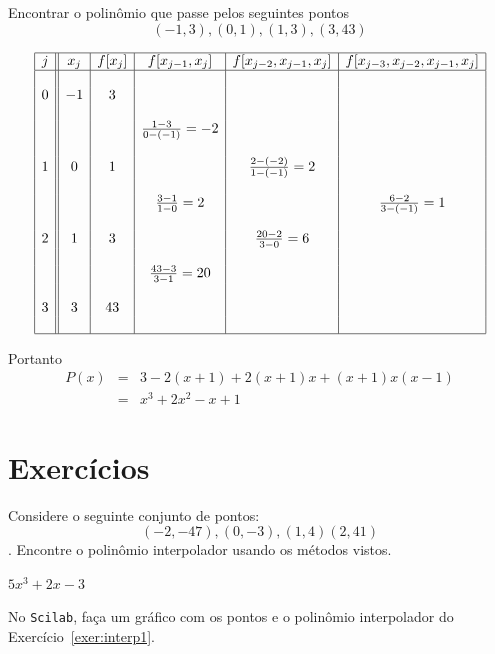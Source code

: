 \begin{ex}
Encontrar o polinômio que passe pelos seguintes pontos
$$(-1,3),(0,1),(1,3),(3,43)$$

\begin{equation*}
\begin{array}{|c||c|c|c|c|c|}\hline
 j&x_j&f[x_j]&f[x_{j-1},x_j]&f[x_{j-2},x_{j-1},x_j]&f[x_{j-3},x_{j-2},x_{j-1},x_j]\\\hline
&&&&&\\
0& -1 & 3&&&\\
&&&&&\\
&&&\frac{1-3}{0-(-1)}=-2&&\\
&&&&&\\
1&0&1&&\frac{2-(-2)}{1-(-1)}=2&\\
&&&&&\\
&&&\frac{3-1}{1-0}=2&&\frac{6-2}{3-(-1)}=1\\
&&&&&\\
2&1&3&&\frac{20-2}{3-0}=6&\\
&&&&&\\
&&&\frac{43-3}{3-1}=20&&\\
&&&&&\\
3&3&43&&&\\
&&&&&\\\hline
\end{array}  
\end{equation*}



Portanto
\begin{eqnarray*}
P(x)&=&3-2(x+1)+2(x+1)x+(x+1)x(x-1)\\
&=&x^3+2x^2-x+1
\end{eqnarray*}
\end{ex}

\section*{Exercícios}


\begin{Exercise}\label{exer:interp1}
Considere o seguinte conjunto de pontos: $$(-2,-47),(0,-3),(1,4)(2,41)$$. Encontre o polinômio interpolador usando os métodos vistos. 
\end{Exercise}
\begin{Answer}
  \begin{tiny}
$5x^3+2x-3$    
  \end{tiny}
\end{Answer}

\ifisscilab
\begin{Exercise}
  No \verb+Scilab+, faça um gráfico com os pontos e o polinômio interpolador do Exercício~\ref{exer:interp1}.
\end{Exercise}
\fi

